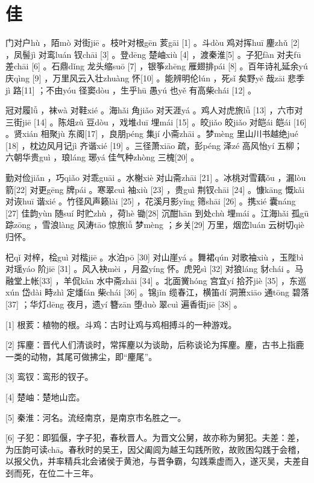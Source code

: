 \documentclass[12pt,UTF8]{ctexbook}
\begin{document}
\chapter{佳}


门对户hù ，陌mò 对街jiē 。枝叶对根gēn 荄gāi [1] 。斗dòu 鸡对挥huī 麈zhǔ [2] ，凤髻jì 对鸾luán 钗chāi [3] 。登dēng 楚岫xiù [4] ，渡秦淮[5] 。子犯fàn 对夫fū 差chāi [6] 。石鼎dǐng 龙头缩suō [7] ，银筝zhēng 雁翅排pái [8] 。百年诗礼延余yú 庆qìng [9] ，万里风云入壮zhuàng 怀[10] 。能辨明伦lún ，死sǐ 矣野yě 哉zāi 悲季jì 路[11] ；不由yóu 径窦dòu ，生乎hū 愚yú 也yě 有高柴chái [12] 。

冠对履lǚ ，袜wà 对鞋xié 。海hǎi 角jiǎo 对天涯yá 。鸡人对虎旅lǚ [13] ，六市对三街jiē [14] 。陈俎zǔ 豆dòu ，戏堆duī 埋mái [15] 。皎jiǎo 皎jiǎo 对皑ái 皑ái [16] 。贤xián 相聚jù 东阁[17] ，良朋péng 集jí 小斋zhāi 。梦mèng 里山川书越绝jué [18] ，枕边风月记jì 齐谐xié [19] 。三径萧xiāo 疏，彭péng 泽zé 高风怡yí 五柳；六朝华贵guì ，琅láng 琊yá 佳气种zhòng 三槐[20] 。

勤对俭jiǎn ，巧qiǎo 对乖guāi 。水榭xiè 对山斋zhāi [21] 。冰桃对雪藕ǒu ，漏lòu 箭[22] 对更gēng 牌pái 。寒翠cuì 袖xiù [23] ，贵guì 荆钗chāi [24] 。慷kāng 慨kǎi 对诙huī 谐xié 。竹径风声籁lài [25] ，花溪月影yǐng 筛shāi [26] 。携xié 囊náng [27] 佳韵yùn 随suí 时贮zhù ，荷hè 锄[28] 沉酣hān 到处chù 埋mái 。江海hǎi 孤gū 踪zōng ，雪浪làng 风涛tāo 惊旅lǚ 梦mèng ；乡关[29] 万里，烟峦luán 云树切qiè 归怀。

杞qǐ 对梓，桧guì 对楷jiē 。水泊pō [30] 对山崖yá 。舞裙qún 对歌袖xiù ，玉陛bì 对瑶yáo 阶jiē [31] 。风入袂mèi ，月盈yíng 怀。虎兕sì [32] 对狼láng 豺chái 。马融堂上帐[33] ，羊侃kǎn 水中斋zhāi [34] 。北面黉hóng 宫宜yí 拾芥jiè [35] ，东巡xún 岱dài 畤zhì 定燔fán 柴chái [36] 。锦jǐn 缆春江，横笛dí 洞箫xiāo 通tōng 碧落[37] ；华灯dēng 夜月，遗yí 簪zān 堕duò 翠cuì 遍香街jiē [38] 。


[1] 根荄：植物的根。斗鸡：古时让鸡与鸡相搏斗的一种游戏。

[2] 挥麈：晋代人们清谈时，常挥麈以为谈助，后称谈论为挥麈。麈，古书上指鹿一类的动物，其尾可做拂尘，即“麈尾”。

[3] 鸾钗：鸾形的钗子。

[4] 楚岫：楚地山峦。

[5] 秦淮：河名。流经南京，是南京市名胜之一。

[6] 子犯：即狐偃，字子犯，春秋晋人。为晋文公舅，故亦称为舅犯。夫差：差，为压韵可读chā。春秋时的吴王，因父阖闾为越王勾践所败，故败困勾践于会稽，以报父仇，并率精兵北会诸侯于黄池，与晋争霸，勾践乘虚而入，遂灭吴，夫差自刭而死，在位二十三年。
\end{document}
